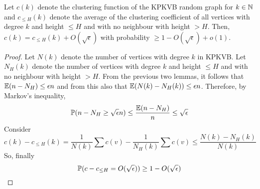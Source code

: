 \begin{lemma}
Let $c(k)$ denote the clustering function of the KPKVB random graph for $k \in \mathbb{N}$ and $c_{\leq H}(k)$ denote the average of the clustering coefficient of all vertices with degree $k$ and height $\leq H$ and with no neighbour with height $>H$. Then,
$c(k) = c_{\leq H}(k) + O(\sqrt{\epsilon})$ with probability $\geq 1-O(\sqrt{\epsilon})+o(1)$.
\end{lemma}
\begin{proof}
Let $N(k)$ denote the number of vertices with degree $k$ in KPKVB.
Let $N_H(k)$ denote the number of vertices with degree $k$ and height $\leq H$ and with no neighbour with height $>H$. From the previous two lemmas, it follows that $\mathbb{E} (n- N_H) \leq \epsilon n$ and from this also that $\mathbb{E} (N(k)-N_H(k))\leq \epsilon n$. Therefore, by Markov's inequality, 
$$\mathbb{P}( n-N_H \geq \sqrt{\epsilon}n) \leq \frac{\mathbb{E} (n-N_H)}{n} \leq \sqrt{\epsilon}$$
Consider 
$$c(k)-c_{\leq H}(k) = \frac{1}{N(k)}\sum c(v) - \frac{1}{N_H(k)}\sum c(v) \leq \frac{N(k)-N_H(k)}{N(k)}$$
So, finally
$$\mathbb{P}( c-c_{\leq H} = O(\sqrt{\epsilon}) ) \geq 1-O(\sqrt{\epsilon})$$
\end{proof}


